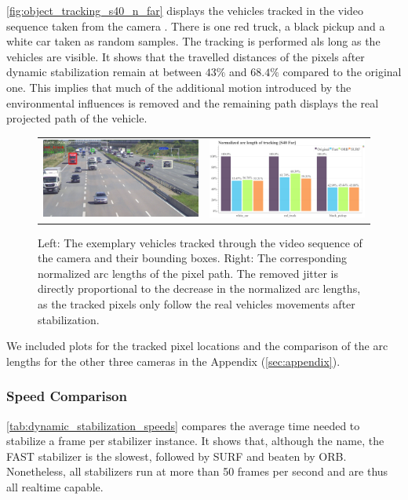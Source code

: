 \autoref{fig:object_tracking_s40_n_far} displays the vehicles tracked in the video sequence taken from the camera . 
There is one red truck, a black pickup and a white car taken as random samples.
The tracking is performed als long as the vehicles are visible.
It shows that the travelled distances of the pixels after dynamic stabilization remain at between $43\%$ and $68.4\%$ compared to the original one.   
This implies that much of the additional motion introduced by the environmental influences is removed and the remaining path displays the real projected path of the vehicle. 

\begin{figure}[!ht]
    \centering
    \begin{tabular}{cc}
      \includegraphics[width=0.475\linewidth]{diagrams/object_tracking/s40_n_far/frame_cropped.png}    &  
      \includegraphics[width=0.475\linewidth]{diagrams/object_tracking/s40_n_far/normalized_arc_lengths.html.png}    
    \end{tabular}
    \caption{Left: 
    The exemplary vehicles tracked through the video sequence of the camera  and their bounding boxes. 
    Right:
    The corresponding normalized arc lengths of the pixel path. 
    The removed jitter is directly proportional to the decrease in the normalized arc lengths, as the tracked pixels only follow the real vehicles movements after stabilization.
    }
    \label{fig:object_tracking_s40_n_far}
\end{figure}

We included plots for the tracked pixel locations and the comparison of the arc lengths for the other three cameras in the Appendix (\autoref{sec:appendix}).

\subsubsection{Speed Comparison}
\autoref{tab:dynamic_stabilization_speeds} compares the average time needed to stabilize a frame per stabilizer instance.
It shows that, although the name, the FAST stabilizer is the slowest, followed by SURF and beaten by ORB.
Nonetheless, all stabilizers run at more than 50 frames per second and are thus all realtime capable.

